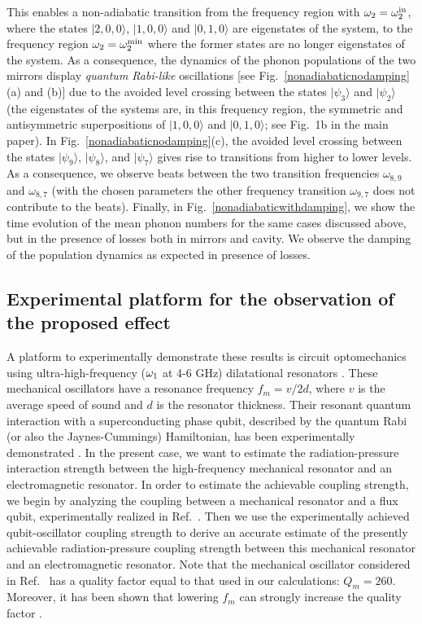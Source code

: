\documentclass[aps,pra,twocolumn,floatfix,longbibliography, superscriptaddress]{revtex4-1}
\newcommand{\ket}[1]{|#1\rangle}
\newcommand{\figref}[1]{\mbox{Fig.~\ref{#1}}}
\begin{document}
This enables a non-adiabatic transition from the frequency region with $\omega_2=\omega^{\rm in}_2$, where the states $\ket{2,0,0}$, $\ket{1,0,0}$ and $\ket{0,1,0}$ are eigenstates of the system, to the frequency region $\omega_2=\omega_2^{\rm min}$ where the former states are no longer eigenstates of the system. As a consequence,  the dynamics of the phonon populations of the two mirrors display  {\em quantum Rabi-like} oscillations [see \figref{nonadiabaticnodamping}(a) and (b)] due to 
the avoided level crossing between the states $\ket{\psi_3}$ and $\ket{\psi_2}$  (the eigenstates of the systems  are, in this frequency region,  the symmetric and antisymmetric superpositions of $\ket{1,0,0}$ and $\ket{0,1,0}$; see Fig.~1b in the main paper). In  \figref{nonadiabaticnodamping}(c), the avoided level crossing between the states $\ket{\psi_9}$,  $\ket{\psi_8}$, and $\ket{\psi_7}$ gives rise to transitions from higher to lower levels. As a consequence,  we observe beats between the two transition frequencies $\omega_{8,9}$ and $\omega_{8,7}$ (with the chosen parameters the other frequency transition $\omega_{9,7}$ does not contribute to the beats). 
Finally, in  \figref{nonadiabaticwithdamping}, we show the time evolution of the mean phonon numbers for the same cases discussed above, but in the presence of losses both in mirrors and cavity. We observe the damping of the population dynamics as expected in presence of losses.


\subsection{Experimental platform for the observation of the proposed effect} \label{Subsec:G}


A platform to experimentally demonstrate these results is circuit optomechanics using ultra-high-frequency ($\omega_{\rm 1}$ at 4-6 GHz) dilatational resonators \cite{OConnell2010}. These mechanical oscillators have a resonance frequency  $f_m = v/2d$, where $v$ is the average  speed of sound and $d$ is the resonator thickness.
Their resonant quantum interaction with a superconducting phase qubit, described by the quantum Rabi  (or also the Jaynes-Cummings) Hamiltonian, has been experimentally demonstrated \cite{OConnell2010, Rouxinol2016}.
In the present case, we want to estimate the radiation-pressure interaction strength between the high-frequency mechanical resonator and an electromagnetic resonator. In order to estimate the achievable coupling strength, we begin by analyzing the coupling between a mechanical resonator and a flux qubit, experimentally realized in Ref.~\cite{OConnell2010}. Then we use the experimentally achieved qubit-oscillator coupling strength to derive an accurate estimate of the presently achievable radiation-pressure coupling strength between this mechanical resonator and an electromagnetic resonator. 
Note that the mechanical oscillator considered in Ref.~\cite{OConnell2010} has a quality factor equal to that used in our calculations: $Q_m = 260$. Moreover, it has been shown that lowering $f_m$ can strongly increase the quality factor \cite{Cleland2004}.
\end{document}
